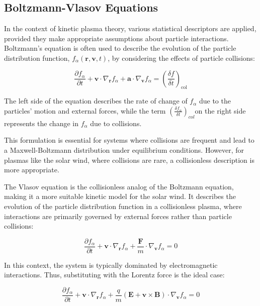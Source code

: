 \documentclass[12pt]{article}
\begin{document}
\subsection{Boltzmann-Vlasov Equations}

In the context of kinetic plasma theory, various statistical descriptors are applied, provided they make appropriate assumptions about particle interactions. Boltzmann's equation is often used to describe the evolution of the particle distribution function, $f_\alpha(\mathbf{r}, \mathbf{v}, t)$, by considering the effects of particle collisions:

\begin{equation}
    \frac{\partial f_\alpha}{\partial t} + \mathbf{v} \cdot \nabla_{\mathbf{r}} f_\alpha + \mathbf{a} \cdot \nabla_{\mathbf{v}} f_\alpha = \left(\frac{\delta f}{\delta t}\right)_{\mathrm{col}}
\end{equation}

The left side of the equation describes the rate of change of $f_\alpha$ due to the particles' motion and external forces, while the term $\left( \frac{\delta f_\alpha}{\delta t} \right)_{col}$on the right side represents the change in $f_\alpha$ due to collisions.

This formulation is essential for systems where collisions are frequent and lead to a Maxwell-Boltzmann distribution under equilibrium conditions. However, for plasmas like the solar wind, where collisions are rare, a collisionless description is more appropriate.

The Vlasov equation is the collisionless analog of the Boltzmann equation, making it a more suitable kinetic model for the solar wind. It describes the evolution of the particle distribution function in a collisionless plasma, where interactions are primarily governed by external forces rather than particle collisions:

\begin{equation} \frac{\partial f_\alpha}{\partial t} + \mathbf{v} \cdot \nabla_{\mathbf{r}} f_\alpha + \frac{\mathbf{F}}{m} \cdot \nabla_{\mathbf{v}} f_\alpha = 0 \end{equation}

In this context, the system is typically dominated by electromagnetic interactions. Thus, substituting with the Lorentz force is the ideal case:

\begin{equation}
    \frac{\partial f_\alpha}{\partial t} + \mathbf{v} \cdot \nabla_{\mathbf{r}} f_\alpha + \frac{q}{m} (\mathbf{E} + \mathbf{v} \times \mathbf{B}) \cdot \nabla_{\mathbf{v}} f_\alpha = 0
\end{equation}
\end{document}
